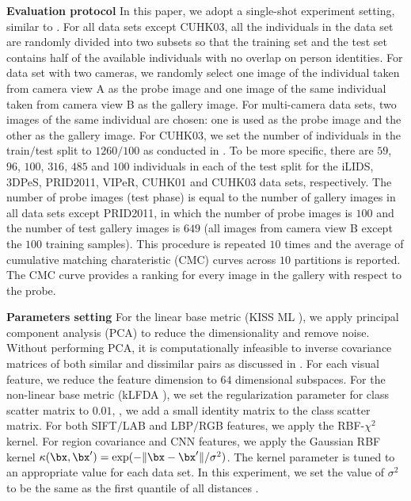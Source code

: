 \documentclass[10pt,twocolumn,letterpaper]{article}
\renewcommand{\paragraph}{\textbf}
\begin{document}
\paragraph{Evaluation protocol}
In this paper, we adopt a single-shot experiment
setting, similar to \cite{Li2013Learning,
Pedagadi2013Local, Xiong2014Person, Zhao2014Learning, Zheng2011Person}.
For all data sets except CUHK03, all the individuals in the data set are
randomly divided into two subsets so that
the training set and the test
set contains half of the available individuals with no overlap on person identities.
For data set with two cameras, we randomly select one image of the individual
taken from camera view A as the probe image
and one image of the same individual taken from camera view B
as the gallery image.
For multi-camera data sets, two images of the same individual
are chosen: one is used as the probe image and the other as the gallery image.
For CUHK03, we set the number of individuals in the train$/$test split
to $1260$$/$$100$ as conducted in \cite{Li2014Deep}.
To be more specific, there are $59$, $96$, $100$, $316$, $485$ and $100$ individuals
in each of the test split for the iLIDS, 3DPeS, PRID2011, VIPeR, CUHK01 and CUHK03
data sets, respectively.
The number of probe images (test phase) is equal to the number of
gallery images in all data sets except
PRID2011, in which the number of probe images is $100$
and the number of test gallery images is $649$
(all images from camera view B except the $100$ training samples).
This procedure is repeated $10$ times and the
average of cumulative matching charateristic (CMC) curves across
$10$ partitions is reported.
The CMC curve provides a ranking for every image in the gallery
with respect to the probe.



\paragraph{Parameters setting}
For the linear base metric (KISS ML \cite{Kostinger2012Large}),
we apply principal component analysis (PCA) to
reduce the dimensionality and remove noise.
Without performing PCA, it is computationally infeasible to
inverse covariance matrices of both similar and dissimilar
pairs as discussed in \cite{Kostinger2012Large}.
For each visual feature, we
reduce the feature dimension to $64$ dimensional subspaces.
For the non-linear base metric (kLFDA \cite{Xiong2014Person}),
we set the regularization parameter
for class scatter matrix to $0.01$,
\ie, we add a small identity matrix to the class scatter matrix.
For both SIFT$/$LAB and LBP$/$RGB features, we apply the RBF-$\chi^2$ kernel.
For region covariance and CNN features, we apply
the Gaussian RBF kernel $\kappa(\bx,\bx^\prime) = \exp(-\| \bx - \bx^\prime \| / \sigma^2)$.
The kernel parameter is tuned to an appropriate value for each
data set.
In this experiment, we set the value of $\sigma^2$ to be the
same as the first quantile of all distances \cite{Xiong2014Person}.
\end{document}
